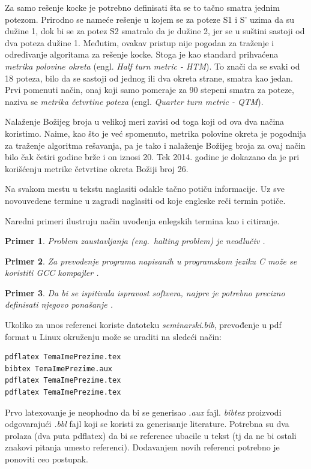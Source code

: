 \documentclass[a4paper]{article}
\newtheorem{primer}{Primer}[section]
\begin{document}
Za samo rešenje kocke je potrebno definisati šta se to tačno smatra jednim potezom. Prirodno se nameće rešenje u kojem se za poteze S1 i S' uzima da su dužine 1, dok bi se za potez S2 smatralo da je dužine 2, jer se u suštini sastoji od dva poteza dužine 1. Međutim, ovakav pristup nije pogodan za traženje i određivanje algoritama za rešenje kocke. Stoga je kao standard prihvaćena \emph{metrika polovine okreta} (engl. \emph{Half turn metric - HTM}). To znači da se svaki od 18 poteza, bilo da se sastoji od jednog ili dva okreta strane, smatra kao jedan. Prvi pomenuti način, onaj koji samo pomeraje za 90 stepeni smatra za poteze, naziva se \emph{metrika četvrtine poteza} (engl. \emph{Quarter turn metric - QTM}). 

Nalaženje Božijeg broja u velikoj meri zavisi od toga koji od ova dva načina koristimo. Naime, kao što je već spomenuto, metrika polovine okreta je pogodnija za traženje algoritma rešavanja, pa je tako i nalaženje Božijeg broja za ovaj način bilo čak četiri godine brže i on iznosi 20. Tek 2014. godine je dokazano da je pri korišćenju metrike četvrtine okreta Božiji broj 26.

Na svakom mestu u tekstu naglasiti odakle tačno potiču informacije. Uz sve novouvedene termine u zagradi naglasiti od koje engleske reči termin potiče. 

Naredni primeri ilustruju način uvođenja enlegskih termina kao i citiranje.

\begin{primer}
Problem zaustavljanja (eng.~{\em halting problem}) je neodlučiv \cite{haltingproblem}.
\end{primer}

\begin{primer}
Za prevođenje programa napisanih u programskom jeziku C može se koristiti GCC kompajler \cite{gcc}.
\end{primer}

\begin{primer}
 Da bi se ispitivala ispravost softvera, najpre je potrebno precizno definisati njegovo ponašanje \cite{laski2009software}. 
\end{primer}

Ukoliko za unos referenci koriste datoteku {\em seminarski.bib},  prevođenje u pdf format u Linux okruženju može se uraditi na sledeći način:
\begin{verbatim}
pdflatex TemaImePrezime.tex 
bibtex TemaImePrezime.aux 
pdflatex TemaImePrezime.tex 
pdflatex TemaImePrezime.tex 
\end{verbatim}
Prvo latexovanje je neophodno da bi se generisao {\em .aux} fajl. {\em bibtex} proizvodi odgovarajući {\em .bbl} fajl koji se koristi za generisanje literature. 
Potrebna su dva prolaza (dva puta pdflatex) da bi se reference ubacile u tekst (tj da ne bi ostali znakovi pitanja umesto referenci). Dodavanjem novih referenci potrebno je ponoviti ceo postupak.  
\end{document}
